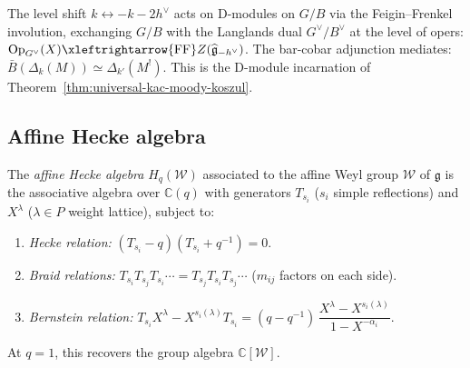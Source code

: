 \begin{remark}
\label{rem:koszul-langlands-flag}
The level shift $k \leftrightarrow -k - 2h^\vee$ acts on D-modules on $G/B$ via the Feigin--Frenkel involution, exchanging $G/B$ with the Langlands dual $G^\vee/B^\vee$ at the level of opers: $\mathrm{Op}_{G^\vee}(X) \xleftrightarrow{\mathrm{FF}} Z(\widehat{\mathfrak{g}}_{-h^\vee})$.  The bar-cobar adjunction mediates: $\bar{B}(\Delta_k(M)) \simeq \Delta_{k'}(M^!)$.  This is the D-module incarnation of Theorem~\ref{thm:universal-kac-moody-koszul}.
\end{remark}

\subsection{Affine Hecke algebra}

\begin{definition}\label{def:affine-hecke}
The \emph{affine Hecke algebra} $H_q(\mathcal{W})$ associated to the
affine Weyl group $\mathcal{W}$ of $\mathfrak{g}$ is the associative
algebra over $\mathbb{C}(q)$ with generators $T_{s_i}$ ($s_i$ simple
reflections) and $X^\lambda$ ($\lambda \in P$ weight lattice),
subject to:
\begin{enumerate}[label=\textup{(\roman*)}]
\item \emph{Hecke relation:}
  $(T_{s_i} - q)(T_{s_i} + q^{-1}) = 0$.
\item \emph{Braid relations:}
  $T_{s_i}T_{s_j}T_{s_i}\cdots = T_{s_j}T_{s_i}T_{s_j}\cdots$
  ($m_{ij}$ factors on each side).
\item \emph{Bernstein relation:}
  $T_{s_i} X^\lambda - X^{s_i(\lambda)} T_{s_i}
  = (q - q^{-1})\,\dfrac{X^\lambda - X^{s_i(\lambda)}}{1 - X^{-\alpha_i}}$.
\end{enumerate}
At $q = 1$, this recovers the group algebra $\mathbb{C}[\mathcal{W}]$.
\end{definition}

